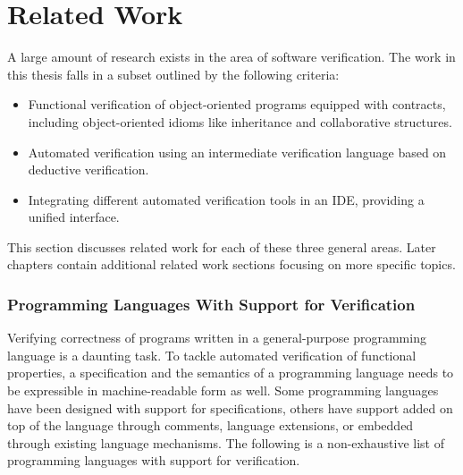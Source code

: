\section{Related Work}\label{sec:intro:related}


A large amount of research exists in the area of software verification.
The work in this thesis falls in a subset outlined by the following criteria:
\begin{itemize}
\item
Functional verification of object-oriented programs equipped with contracts, including object-oriented idioms like inheritance and collaborative structures.

\item
Automated verification using an intermediate verification language based on deductive verification.

\item
Integrating different automated verification tools in an IDE, providing a unified interface.

\end{itemize}
This section discusses related work for each of these three general areas.
Later chapters contain additional related work sections focusing on more specific topics.


\subsubsection{Programming Languages With Support for Verification}

Verifying correctness of programs written in a general-purpose programming language is a daunting task.
To tackle automated verification of functional properties, a specification and the semantics of a programming language needs to be expressible in machine-readable form as well.
Some programming languages have been designed with support for specifications, others have support added on top of the language through comments, language extensions, or embedded through existing language mechanisms.
The following is a non-exhaustive list of programming languages with support for verification.

